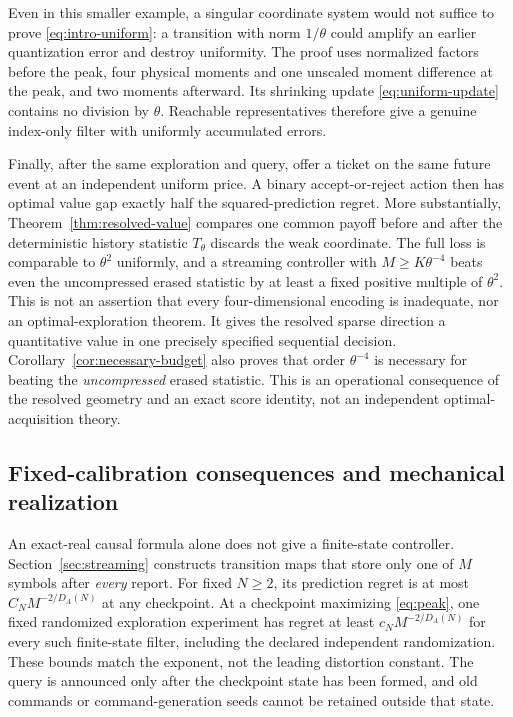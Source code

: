 Even in this smaller example, a singular coordinate system would not suffice to prove
\eqref{eq:intro-uniform}: a transition with norm $1/\theta$ could
amplify an earlier quantization error and destroy uniformity. The proof
uses normalized factors before the peak, four physical moments and one
unscaled moment difference at the peak, and two moments afterward. Its
shrinking update \eqref{eq:uniform-update} contains no division by
$\theta$. Reachable representatives therefore give a genuine index-only
filter with uniformly accumulated errors.

Finally, after the same exploration and query, offer a ticket on the
same future event at an independent uniform price. A binary accept-or-reject
action then has optimal value gap exactly half the squared-prediction
regret. More substantially, Theorem~\ref{thm:resolved-value} compares
one common payoff before and after the deterministic history statistic
$T_\theta$ discards the weak coordinate. The full loss is comparable
to $\theta^2$ uniformly, and a streaming controller with
$M\ge K\theta^{-4}$ beats even the uncompressed erased statistic by
at least a fixed positive multiple of $\theta^2$. This is not an
assertion that every four-dimensional encoding is inadequate, nor an
optimal-exploration theorem. It gives the resolved sparse direction a
quantitative value in one precisely specified sequential decision. Corollary~\ref{cor:necessary-budget}
also proves that order $\theta^{-4}$ is necessary for beating the
\emph{uncompressed} erased statistic. This is an operational consequence
of the resolved geometry and an exact score identity, not an independent
optimal-acquisition theory.

\subsection{Fixed-calibration consequences and mechanical realization}
An exact-real causal formula alone does not give a finite-state controller.
Section~\ref{sec:streaming} constructs transition maps that store only one
of $M$ symbols after \emph{every} report. For fixed $N\ge2$, its prediction
regret is at most $C_NM^{-2/D_A(N)}$ at any checkpoint. At a checkpoint
maximizing \eqref{eq:peak}, one fixed randomized exploration experiment
has regret at least $c_NM^{-2/D_A(N)}$ for every such finite-state filter,
including the declared independent randomization. These bounds match the
exponent, not the leading distortion constant. The query is announced
only after the checkpoint state has been formed, and old commands or
command-generation seeds cannot be retained outside that state.

